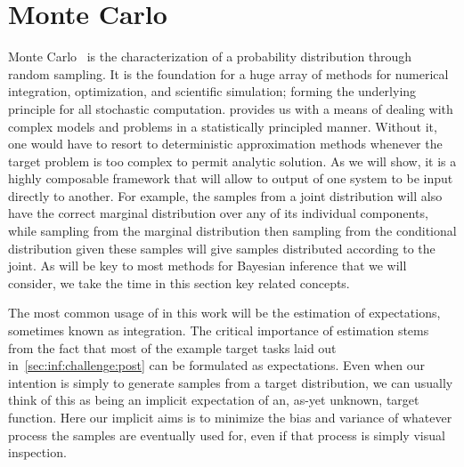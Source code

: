 
\section{Monte Carlo}
\label{sec:inf:mc}

Monte Carlo~\citep{metropolis1949monte} is the characterization of a probability distribution 
through random sampling. It is the foundation for a huge array of methods for numerical 
integration, optimization, and scientific simulation; forming the underlying principle 
for all stochastic computation.
\mc provides us with a means of dealing with complex models and problems in a
statistically principled manner.  Without it, one would have to resort to deterministic
approximation methods whenever the target problem is too complex to permit analytic
solution.  As we will show, it is a highly composable framework that will allow to output
of one system to be input directly to another.  For example, the \mc samples from a joint
distribution will also have the correct marginal distribution over any of its individual components,
while sampling from the marginal distribution then sampling from the conditional distribution
given these samples will give samples distributed according to the joint.  As \mc
will be key to most methods for Bayesian inference that we will consider, we take the time
in this section key related concepts.

The most common usage of \mc in this work will be the \mc estimation of expectations, 
sometimes known as \mc integration.  
The critical importance of \mc estimation stems from the fact that most of the example
target tasks laid out in~\ref{sec:inf:challenge:post} can be formulated as expectations.
Even when our intention is simply to generate samples from a target distribution, we can
usually think of this as being an implicit expectation of an, as-yet unknown, target function.
Here our implicit aims is to minimize the bias and variance of whatever process the samples are eventually
used for, even if that process is simply visual inspection.  

